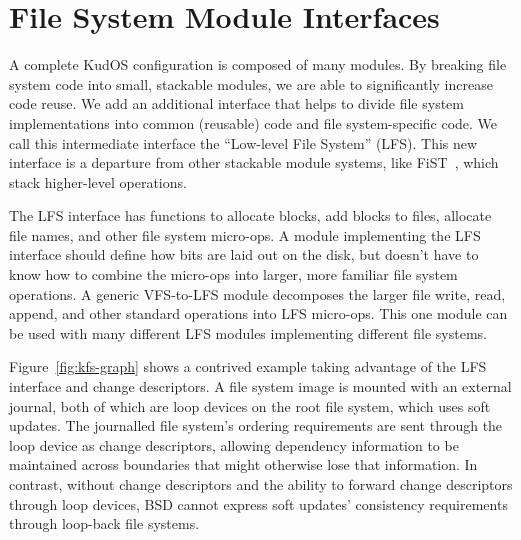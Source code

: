 \preparagraphspacing{}
\section*{File System Module Interfaces}
\label{sec:interfaces}

A complete KudOS configuration is composed of many modules.
By breaking file system code into
small, stackable modules, we are able to significantly increase code reuse.
We add an additional interface that helps to divide file system
implementations into common (reusable) code and file system-specific code.
We call this intermediate interface the ``Low-level File System'' (LFS). This
new interface is a departure from other stackable module systems,
like FiST~\cite{zadok00fist}, which stack higher-level operations.

The LFS interface has functions to allocate blocks, add blocks to
files, allocate file names, and other file system micro-ops. A module
implementing the LFS interface should define how bits are laid out on
the disk, but doesn't have to know how to combine the micro-ops
into larger, more familiar file system operations. 
A generic VFS-to-LFS module decomposes the larger file write,
read, append, and other standard operations into LFS micro-ops. This
one module can be used with many different LFS modules implementing
different file systems.

Figure~\ref{fig:kfs-graph} shows a contrived example taking advantage of the
LFS interface and change descriptors. A file system image is mounted
with an external journal, both of which are loop devices on the root file
system, which uses soft updates.
%
The journalled file system's ordering requirements are sent through the loop
device as change descriptors, allowing dependency information to be maintained
across boundaries that might otherwise lose that information.
%
In contrast, without change descriptors and the ability to forward change
descriptors through loop devices, BSD cannot express soft updates'
consistency requirements through loop-back file systems.

